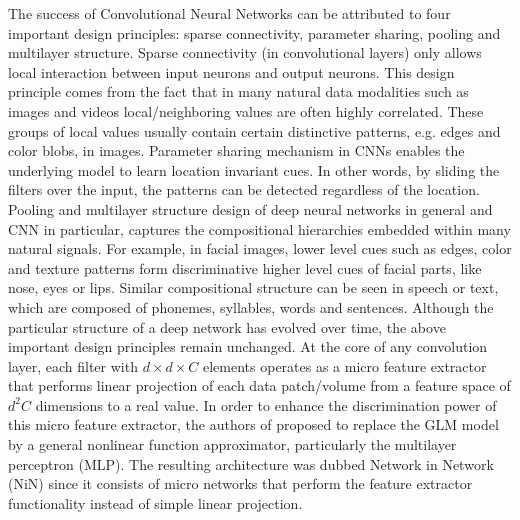 \documentclass[conference,usletter]{IEEEtran}
\begin{document}
The success of Convolutional Neural Networks can be attributed to four important design principles: sparse connectivity, parameter sharing, pooling and multilayer structure. Sparse connectivity (in convolutional layers) only allows local interaction between input neurons and output neurons. This design principle comes from the fact that in many natural data modalities such as images and videos local/neighboring values are often highly correlated. These groups of local values usually contain certain distinctive patterns, e.g. edges and color blobs, in images. Parameter sharing mechanism in CNNs enables the underlying model to learn location invariant cues. In other words, by sliding the filters over the input, the patterns can be detected regardless of the location. Pooling and multilayer structure design of deep neural networks in general and CNN in particular, captures the compositional hierarchies embedded within many natural signals. For example, in facial images, lower level cues such as edges, color and texture patterns form discriminative higher level cues of facial parts, like nose, eyes or lips. Similar compositional structure can be seen in speech or text, which are composed of phonemes, syllables, words and sentences. Although the particular structure of a deep network has evolved over time, the above important design principles remain unchanged. At the core of any convolution layer, each filter with $d
\times d \times C$ elements operates as a micro feature extractor that performs linear projection of each data patch/volume from a feature space of $d^2C$ dimensions to a real value. In order to enhance the discrimination power of this micro feature extractor, the authors of \cite{lin2013network} proposed to replace the GLM model by a general nonlinear function approximator, particularly the multilayer perceptron (MLP). The resulting architecture was dubbed Network in Network (NiN) since it consists of micro networks that perform the feature extractor functionality instead of simple linear projection.
\end{document}
